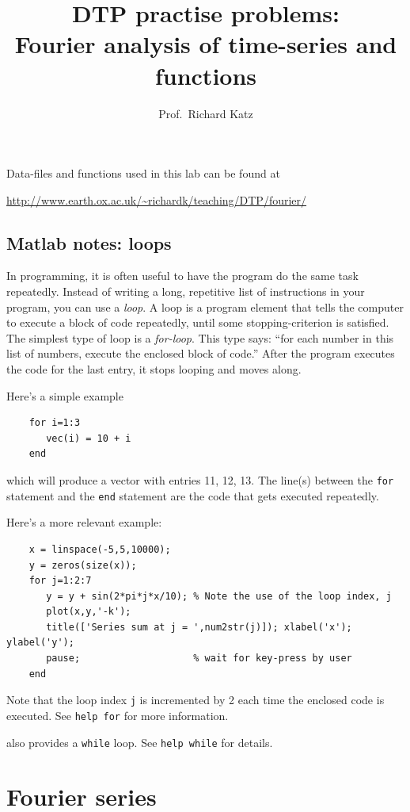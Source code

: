 \documentclass[12pt,twoside,a4paper]{article}
\title{DTP practise problems:\\ Fourier analysis of time-series and
  functions} \author{Prof.~Richard Katz}
\begin{document}
\maketitle{}

Data-files and functions used in this lab can be found at
\begin{center}
  \url{http://www.earth.ox.ac.uk/~richardk/teaching/DTP/fourier/}
\end{center}

\subsection*{Matlab notes: loops}

In programming, it is often useful to have the program do the same
task repeatedly.  Instead of writing a long, repetitive list of
instructions in your program, you can use a \textit{loop}.  A loop is
a program element that tells the computer to execute a block of code
repeatedly, until some stopping-criterion is satisfied.  The simplest
type of loop is a \textit{for-loop}.  This type says: ``for each
number in this list of numbers, execute the enclosed block of code.''
After the program executes the code for the last entry, it stops
looping and moves along.

Here's a simple example
\begin{verbatim}
    for i=1:3
       vec(i) = 10 + i
    end
\end{verbatim}
which will produce a vector with entries 11, 12, 13. The line(s)
between the \texttt{for} statement and the \texttt{end} statement are
the code that gets executed repeatedly.

Here's a more relevant example:
\begin{verbatim}
    x = linspace(-5,5,10000);
    y = zeros(size(x));
    for j=1:2:7
       y = y + sin(2*pi*j*x/10); % Note the use of the loop index, j
       plot(x,y,'-k'); 
       title(['Series sum at j = ',num2str(j)]); xlabel('x'); ylabel('y');
       pause;                    % wait for key-press by user
    end
\end{verbatim}
Note that the loop index \texttt{j} is incremented by 2 each time the
enclosed code is executed.  See \texttt{help for} for more
information.

\Mlab also provides a \texttt{while} loop.  See \texttt{help while}
for details.

\section{Fourier series}
\end{document}
